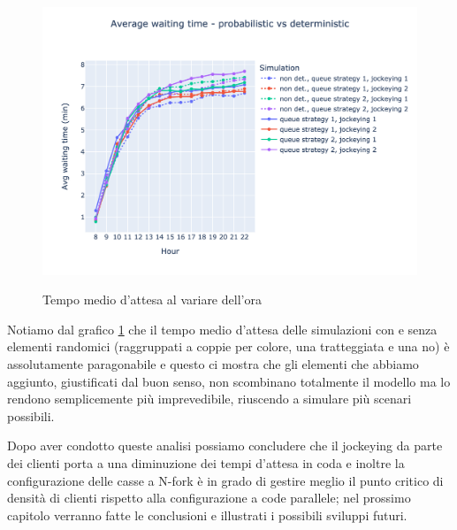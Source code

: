 \begin{figure}[H]
	\centering
	\includegraphics[width=12cm]{"images/results/avg_wt_prob.png"}
	\label{fig:avg_wt_prob}
	\caption{Tempo medio d'attesa al variare dell'ora}
\end{figure}

Notiamo dal grafico \ref{fig:avg_wt_prob} che il tempo medio d'attesa delle simulazioni con e senza elementi randomici (raggruppati a coppie per colore, una tratteggiata e una no) è assolutamente paragonabile e questo ci mostra che gli elementi che abbiamo aggiunto, giustificati dal buon senso, non scombinano totalmente il modello ma lo rendono semplicemente più imprevedibile, riuscendo a simulare più scenari possibili.

\vspace*{1\baselineskip}

Dopo aver condotto queste analisi possiamo concludere che il jockeying
da parte dei clienti porta a una diminuzione dei tempi d'attesa in
coda e inoltre la configurazione delle casse a N-fork è in grado di
gestire meglio il punto critico di densità di clienti rispetto alla
configurazione a code parallele; nel prossimo capitolo verranno fatte
le conclusioni e illustrati i possibili sviluppi futuri.
